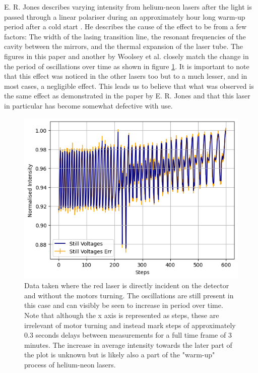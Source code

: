 \documentclass[%
reprint,
amsmath,amssymb,
aps,
]{revtex4-2}
\begin{document}
			E. R. Jones describes varying intensity from helium-neon lasers after the light is passed through a linear polariser during an approximately hour long warm-up period after a cold start \cite{jonesPolarisation}. He describes the cause of the effect to be from a few factors: The width of the lasing transition line, the resonant frequencies of the cavity between the mirrors, and the thermal expansion of the laser tube. The figures in this paper and another by Woolsey et al. \cite{woolseyPolarisation} closely match the change in the period of oscillations over time as shown in figure \ref{fig:stillData}. It is important to note that this effect was noticed in the other lasers too but to a much lesser, and in most cases, a negligible effect. This leads us to believe that what was observed is the same effect as demonstrated in the paper by E. R. Jones and that this laser in particular has become somewhat defective with use.
			
			\begin{figure}
				\includegraphics[width=0.85\columnwidth]{stillData.png}
				\caption{\label{fig:stillData}Data taken where the red laser is directly incident on the detector and without the motors turning. The oscillations are still present in this case and can visibly be seen to increase in period over time. Note that although the x axis is represented as steps, these are irrelevant of motor turning and instead mark steps of approximately 0.3 seconds delays between measurements for a full time frame of 3 minutes. The increase in average intensity towards the later part of the plot is unknown but is likely also a part of the "warm-up" process of helium-neon lasers.}
			\end{figure}
\end{document}
